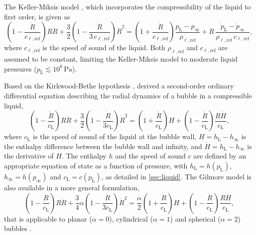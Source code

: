 The Keller-Miksis model \citep{Keller1980, Prosperetti1986}, which incorporates the compressibility of the liquid to first order, is given as
\begin{equation}
\left(1 - \frac{\dot{R}}{c_{\ell,\mathrm{ref}}}\right) R \ddot{R} + \frac{3}{2} \left(1 - \frac{\dot{R}}{3\, c_{\ell,\mathrm{ref}}}\right) \dot{R}^2 =  \left(1 + \frac{\dot{R}}{c_{\ell,\mathrm{ref}}}\right) \frac{p_\text{L} - p_\infty}{\rho_{\ell,\mathrm{ref}}} + R \, \frac{\dot{p}_\text{L} - \dot{p}_\infty}{\rho_{\ell,\mathrm{ref}} \, c_{\ell,\mathrm{ref}}} ,
\label{eq:keller}
\end{equation}
where $c_{\ell,\mathrm{ref}}$ is the speed of sound of the liquid. Both $\rho_{\ell,\mathrm{ref}}$ and $c_{\ell,\mathrm{ref}}$ are assumed to be constant, limiting the Keller-Miksis model to moderate liquid pressures ($p_\mathrm{L} \lesssim 10^8 \, \mathrm{Pa}$).

Based on the Kirkwood-Bethe hypothesis \citep{Kirkwood1942,Denner2024a}, \citet{Gilmore1952} derived a second-order ordinary differential equation describing the radial dynamics of a bubble in a compressible liquid, %
\begin{equation}
  \left( 1 - \frac{\dot{R}}{c_\text{L}} \right) R \ddot{R} + \frac{3}{2} \left( 1 - \frac{\dot{R}}{3 c_\text{L}} \right) \dot{R}^2  = \left( 1 + \frac{\dot{R}}{c_\text{L}} \right) H + \left( 1- \frac{\dot{R}}{c_\text{L}} \right) \frac{R \dot{H}}{c_\text{L}}, \label{eq:gilmore}
\end{equation} 
where $c_\mathrm{L}$ is the speed of sound of the liquid at the bubble wall, $H = h_\text{L} - h_\infty$ is the enthalpy difference between the bubble wall and infinity, and $\dot{H} = \dot{h}_\text{L} - \dot{h}_\infty$ is the derivative of $H$. The enthalpy $h$ and the speed of sound $c$ are defined by an appropriate equation of state as a function of pressure, with $h_\text{L} = h(p_\text{L})$, $h_\infty = h(p_\infty)$ and $c_\text{L} = c(p_\text{L})$, as detailed in \ref{sec:liquid}. The Gilmore model is also available in a more general formulation,
\begin{equation}
    \left( 1 - \frac{\dot{R}}{c_{\mathrm{L}}} \right) R \ddot{R} + \frac{3}{4} \alpha \left( 1 - \frac{\dot{R}}{3 c_{\mathrm{L}}} \right) \dot{R}^2 = \frac{\alpha}{2} \left( 1 + \frac{\dot{R}}{c_{\mathrm{L}}} \right) H + \left( 1- \frac{\dot{R}}{c_{\mathrm{L}}} \right) \frac{R \dot{H}}{c_{\mathrm{L}}}, \label{eq:gilmore_general}
\end{equation}  
that is applicable to planar ($\alpha=0$), cylindrical ($\alpha=1$) and spherical ($\alpha=2$) bubbles \citep{Denner2024a}.

